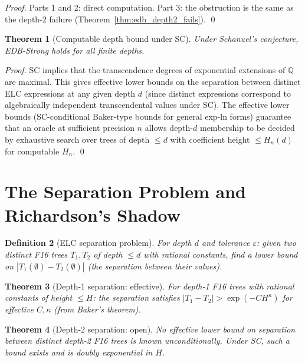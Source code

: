\documentclass[11pt]{article}
\newtheorem{theorem}{Theorem}
\newtheorem{definition}[theorem]{Definition}
\begin{document}
\begin{proof}
Parts 1 and 2: direct computation. Part 3: the obstruction is the same as
the depth-2 failure (Theorem~\ref{thm:edb_depth2_fails}). \qed
\end{proof}

\begin{theorem}[Computable depth bound under SC]
\label{thm:edb_under_sc}
Under Schanuel's conjecture, EDB-Strong holds for all finite depths.
\end{theorem}

\begin{proof}
SC implies that the transcendence degrees of exponential extensions of $\mathbb{Q}$
are maximal. This gives effective lower bounds on the separation between distinct
ELC expressions at any given depth $d$ (since distinct expressions correspond to
algebraically independent transcendental values under SC).
The effective lower bounds (SC-conditional Baker-type bounds for general exp-ln forms)
guarantee that an oracle at sufficient precision $n$ allows depth-$d$ membership
to be decided by exhaustive search over trees of depth $\leq d$ with coefficient
height $\leq H_n(d)$ for computable $H_n$. \qed
\end{proof}

\section{The Separation Problem and Richardson's Shadow}

\begin{definition}[ELC separation problem]
For depth $d$ and tolerance $\varepsilon$: given two distinct F16 trees $T_1, T_2$
of depth $\leq d$ with rational constants, find a lower bound on $|T_1(\emptyset) - T_2(\emptyset)|$
(the separation between their values).
\end{definition}

\begin{theorem}[Depth-1 separation: effective]
For depth-1 F16 trees with rational constants of height $\leq H$:
the separation satisfies $|T_1 - T_2| > \exp(-C H^\kappa)$ for effective $C, \kappa$
(from Baker's theorem).
\end{theorem}

\begin{theorem}[Depth-2 separation: open]
No effective lower bound on separation between distinct depth-2 F16 trees
is known unconditionally. Under SC, such a bound exists and is doubly exponential in $H$.
\end{theorem}
\end{document}
